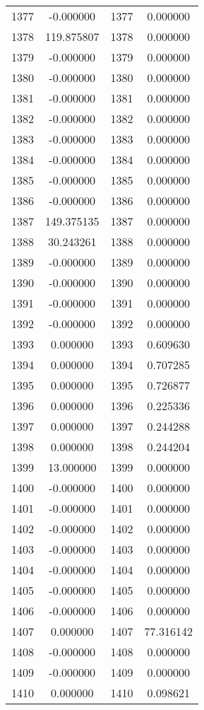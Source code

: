 \documentclass[12pt]{article}
\begin{document}
\begin{longtable}{@{}cccc@{}}
1377 & -0.000000 & 1377 & 0.000000 \\
1378 & 119.875807 & 1378 & 0.000000 \\
1379 & -0.000000 & 1379 & 0.000000 \\
1380 & -0.000000 & 1380 & 0.000000 \\
1381 & -0.000000 & 1381 & 0.000000 \\
1382 & -0.000000 & 1382 & 0.000000 \\
1383 & -0.000000 & 1383 & 0.000000 \\
1384 & -0.000000 & 1384 & 0.000000 \\
1385 & -0.000000 & 1385 & 0.000000 \\
1386 & -0.000000 & 1386 & 0.000000 \\
1387 & 149.375135 & 1387 & 0.000000 \\
1388 & 30.243261 & 1388 & 0.000000 \\
1389 & -0.000000 & 1389 & 0.000000 \\
1390 & -0.000000 & 1390 & 0.000000 \\
1391 & -0.000000 & 1391 & 0.000000 \\
1392 & -0.000000 & 1392 & 0.000000 \\
1393 & 0.000000 & 1393 & 0.609630 \\
1394 & 0.000000 & 1394 & 0.707285 \\
1395 & 0.000000 & 1395 & 0.726877 \\
1396 & 0.000000 & 1396 & 0.225336 \\
1397 & 0.000000 & 1397 & 0.244288 \\
1398 & 0.000000 & 1398 & 0.244204 \\
1399 & 13.000000 & 1399 & 0.000000 \\
1400 & -0.000000 & 1400 & 0.000000 \\
1401 & -0.000000 & 1401 & 0.000000 \\
1402 & -0.000000 & 1402 & 0.000000 \\
1403 & -0.000000 & 1403 & 0.000000 \\
1404 & -0.000000 & 1404 & 0.000000 \\
1405 & -0.000000 & 1405 & 0.000000 \\
1406 & -0.000000 & 1406 & 0.000000 \\
1407 & 0.000000 & 1407 & 77.316142 \\
1408 & -0.000000 & 1408 & 0.000000 \\
1409 & -0.000000 & 1409 & 0.000000 \\
1410 & 0.000000 & 1410 & 0.098621 \\

\end{longtable}
\end{document}
